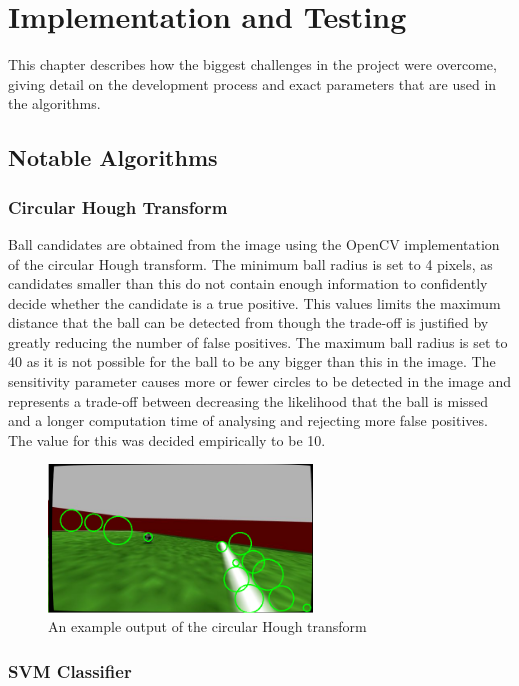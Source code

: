 \chapter{Implementation and Testing}
\label{chapter: 5}

This chapter describes how the biggest challenges in the project were overcome, giving detail on the development process and exact parameters that are used in the algorithms. 

\section{Notable Algorithms}

\subsection{Circular Hough Transform}

Ball candidates are obtained from the image using the OpenCV implementation of the circular Hough transform. The minimum ball radius is set to 4 pixels, as candidates smaller than this do not contain enough information to confidently decide whether the candidate is a true positive. This values limits the maximum distance that the ball can be detected from though the trade-off is justified by greatly reducing the number of false positives. The maximum ball radius is set to 40 as it is not possible for the ball to be any bigger than this in the image. The sensitivity parameter causes more or fewer circles to be detected in the image and represents a trade-off between decreasing the likelihood that the ball is missed and a longer computation time of analysing and rejecting more false positives. The value for this was decided empirically to be 10. 

\begin{figure}[H]
\includegraphics[width=7cm]{images/hough.png}
\centering
\caption{An example output of the circular Hough transform}
\end{figure}

\subsection{SVM Classifier}
\label{section: svm-implement}

